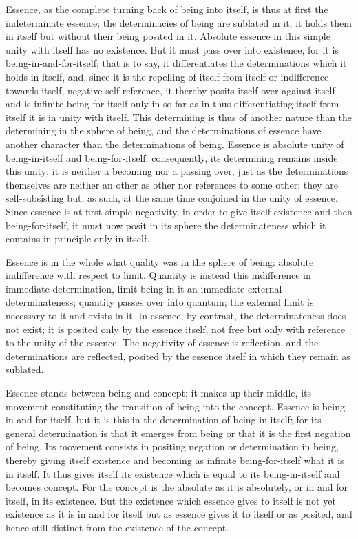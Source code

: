 Essence, as the complete turning back of being into itself,
is thus at first the indeterminate essence;
the determinacies of being are sublated in it;
it holds them in itself but without their being posited in it.
Absolute essence in this simple unity with itself has no existence.
But it must pass over into existence,
for it is being-in-and-for-itself;
that is to say, it differentiates
the determinations which it holds in itself,
and, since it is the repelling of itself from itself
or indifference towards itself, negative self-reference,
it thereby posits itself over against itself
and is infinite being-for-itself
only in so far as in thus
differentiating itself from itself
it is in unity with itself.
This determining is thus of another nature than
the determining in the sphere of being,
and the determinations of essence have another character
than the determinations of being.
Essence is absolute unity of being-in-itself and being-for-itself;
consequently, its determining remains inside this unity;
it is neither a becoming nor a passing over,
just as the determinations themselves are
neither an other as other nor references to some other;
they are self-subsisting but, as such,
at the same time conjoined in the unity of essence.
Since essence is at first simple negativity,
in order to give itself existence and then being-for-itself,
it must now posit in its sphere the determinateness
which it contains in principle only in itself.

Essence is in the whole what quality was in the sphere of being:
absolute indifference with respect to limit.
Quantity is instead this indifference in immediate determination,
limit being in it an immediate external determinateness;
quantity passes over into quantum;
the external limit is necessary to it and exists in it.
In essence, by contrast, the determinateness does not exist;
it is posited only by the essence itself,
not free but only with reference to
the unity of the essence.
The negativity of essence is reflection,
and the determinations are reflected,
posited by the essence itself
in which they remain as sublated.

Essence stands between being and concept;
it makes up their middle,
its movement constituting the transition
of being into the concept.
Essence is being-in-and-for-itself,
but it is this in the determination of being-in-itself;
for its general determination is that it emerges from being
or that it is the first negation of being.
Its movement consists in positing negation
or determination in being, thereby giving
itself existence and becoming
as infinite being-for-itself what it is in itself.
It thus gives itself its existence
which is equal to its being-in-itself
and becomes concept.
For the concept is the absolute as it is absolutely,
or in and for itself, in its existence.
But the existence which essence gives to itself is
not yet existence as it is in and for itself
but as essence gives it to itself or as posited,
and hence still distinct from the existence of the concept.

